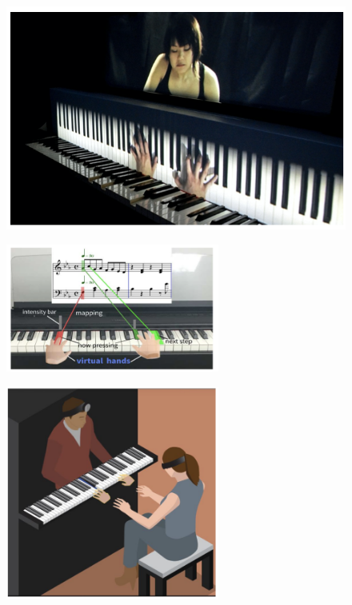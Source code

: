 \documentclass[manuscript,screen]{acmart}
\begin{document}
\begin{figure}
    \centering
    \includegraphics[width=15cm]{figures/xiaomirrorfugue3.png}
    \caption{\cite{xiao2010mirrorfugue} }
    \label{fig:xiaomirrorfugue3}
\end{figure}

\begin{figure}
    \centering
    \includegraphics[width=7cm]{figures/caipiano.png}
    \caption{\cite{cai2019designa} }
    \label{fig:caipiano}
\end{figure}

\begin{figure}
    \centering
    \includegraphics[width=7cm]{figures/gerryadept.png}
    \caption{\cite{gerry2019adept} }
    \label{fig:gerryadept}
\end{figure}
\end{document}
